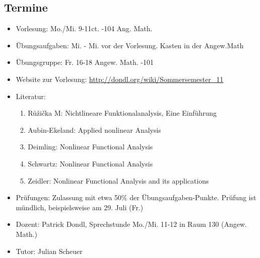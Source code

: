 \documentclass[14pt]{book}
\theoremstyle{plain}
\theoremstyle{nonumberplain}
\numberwithin{equation}{section}
\begin{document}
\subsection*{Termine}
\begin{itemize}
    \item Vorlesung: Mo./Mi. 9-11ct. -104 Ang. Math.
    \item Übungsaufgaben: Mi. - Mi. vor der Vorlesung. Kasten in der Angew.Math
    \item Übungsgruppe: Fr. 16-18 Angew. Math. -101
    \item Website zur Vorlesung: \url{http://dondl.org/wiki/Sommersemester_11}
    \item Literatur: \begin{enumerate}
        \item Růžička M: Nichtlineare Funktionalanalysis, Eine Einführung
        \item Aubin-Ekeland: Applied nonlinear Analysis
        \item Deimling: Nonlinear Functional Analysis
        \item Schwartz: Nonlinear Functional Analysis
        \item Zeidler: Nonlinear Functional Analysis and its applications 
        \end{enumerate}
    \item Prüfungen: Zulassung mit etwa 50\% der Übungsaufgaben-Punkte. Prüfung ist mündlich, 
            beispielsweise am 29. Juli (Fr.) 
    \item Dozent: Patrick Dondl, Sprechstunde Mo./Mi. 11-12 in Raum 130 (Angew. Math.)
    \item Tutor: Julian Scheuer
\end{itemize}

\newpage

\tableofcontents

\newpage\[ \]\newpage \[ \]\newpage

\end{document}
